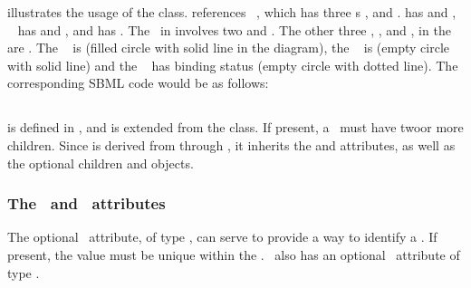  illustrates the usage of the \OutwardBindingSite class.   references \speciesType\ , which has three \speciesTypeInstance s ,  and .   has   and ,  \speciesTypeInstance\  has   and , and   has  . The \inSpeciesTypeBond\ in  involves two   and . The other three , ,  and , in the \species\  are \outwardBindingSites. The \outwardBindingSite\  is  (filled circle with solid line in the diagram), the \outwardBindingSite\  is  (empty circle with solid line) and the \outwardBindingSite\  has binding status  (empty circle with dotted line). The corresponding SBML code would be as follows:



\subsection{}
\label{def:SubListOfSpeciesFeatures}

 is defined in , and is extended from the  class. If present, a \subListOfSpeciesFeatures\ must have  twoor more \SpeciesFeature children. Since  is derived from  through , it inherits the  and  attributes, as well as the optional children  and  objects. 

\subsubsection{The \idAtt\ and \nameAtt\ attributes}
\label{def:SubListOfSpeciesFeatures:id}

The optional \idAtt\ attribute, of type \SIdPT, can serve to provide a way to identify a \subListOfSpeciesFeatures. If present, the value must be unique within the \species. \SubListOfSpeciesFeatures\ also has an optional \nameAtt\ attribute of type \stringPT.


